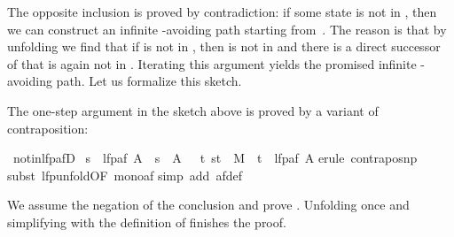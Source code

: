 \begin{isabellebody}
%
\endisadelimproof
%
\begin{isamarkuptext}%
The opposite inclusion is proved by contradiction: if some state
 is not in , then we can construct an
infinite -avoiding path starting from~. The reason is
that by unfolding  we find that if  is not in
, then  is not in  and there is a
direct successor of  that is again not in \mbox{}. Iterating this argument yields the promised infinite
-avoiding path. Let us formalize this sketch.

The one-step argument in the sketch above
is proved by a variant of contraposition:%
\end{isamarkuptext}%
\isamarkuptrue%
\isamarkupfalse%
\ not{}in{}lfp{}afD{}\isanewline
\ {}s\ {}\ lfp{}af\ A{}\ {}\ s\ {}\ A\ {}\ {}{}\ t{}\ {}s{}t{}\ {}\ M\ {}\ t\ {}\ lfp{}af\ A{}{}{}\isanewline
%
\isadelimproof
%
\endisadelimproof
%
\isatagproof
{}\isamarkupfalse%
{}erule\ contrapos{}np{}\isanewline
{}\isamarkupfalse%
{}subst\ lfp{}unfold{}OF\ mono{}af{}{}\isanewline
{}\isamarkupfalse%
{}simp\ add{}\ af{}def{}\isanewline
{}\isamarkupfalse%
%
\endisatagproof
{\isafoldproof}%
%
\isadelimproof
%
\endisadelimproof
%
\begin{isamarkuptext}%
\noindent
We assume the negation of the conclusion and prove .
Unfolding  once and
simplifying with the definition of  finishes the proof.


\end{isamarkuptext}
\end{isabellebody}
